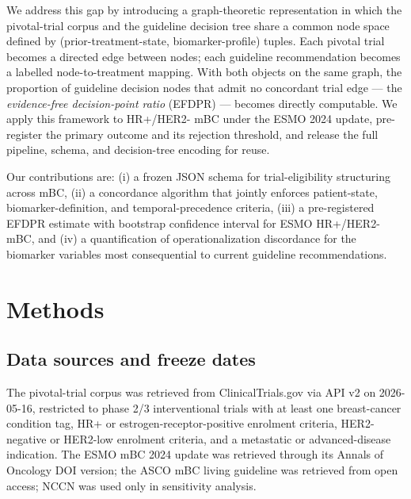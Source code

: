\documentclass[11pt,a4paper]{article}
\begin{document}
We address this gap by introducing a graph-theoretic representation in which the pivotal-trial corpus and the guideline decision tree share a common node space defined by (prior-treatment-state, biomarker-profile) tuples. Each pivotal trial becomes a directed edge between nodes; each guideline recommendation becomes a labelled node-to-treatment mapping. With both objects on the same graph, the proportion of guideline decision nodes that admit no concordant trial edge --- the \emph{evidence-free decision-point ratio} (EFDPR) --- becomes directly computable. We apply this framework to HR+/HER2- mBC under the ESMO 2024 update, pre-register the primary outcome and its rejection threshold, and release the full pipeline, schema, and decision-tree encoding for reuse.

Our contributions are: (i) a frozen JSON schema for trial-eligibility structuring across mBC, (ii) a concordance algorithm that jointly enforces patient-state, biomarker-definition, and temporal-precedence criteria, (iii) a pre-registered EFDPR estimate with bootstrap confidence interval for ESMO HR+/HER2- mBC, and (iv) a quantification of operationalization discordance for the biomarker variables most consequential to current guideline recommendations.

\section{Methods}\label{sec:methods}

\subsection{Data sources and freeze dates}
The pivotal-trial corpus was retrieved from ClinicalTrials.gov via API v2 on 2026-05-16, restricted to phase 2/3 interventional trials with at least one breast-cancer condition tag, HR+ or estrogen-receptor-positive enrolment criteria, HER2-negative or HER2-low enrolment criteria, and a metastatic or advanced-disease indication. The ESMO mBC 2024 update was retrieved through its Annals of Oncology DOI version; the ASCO mBC living guideline was retrieved from open access; NCCN was used only in sensitivity analysis.
\end{document}
